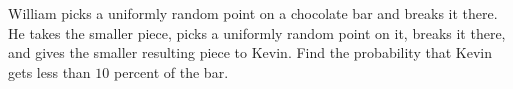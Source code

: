William picks a uniformly random point on a chocolate bar and breaks it there. He takes the smaller piece, picks a uniformly random point on it, breaks it there, and gives the smaller resulting piece to Kevin. Find the probability that Kevin gets less than $10$ percent of the bar.
